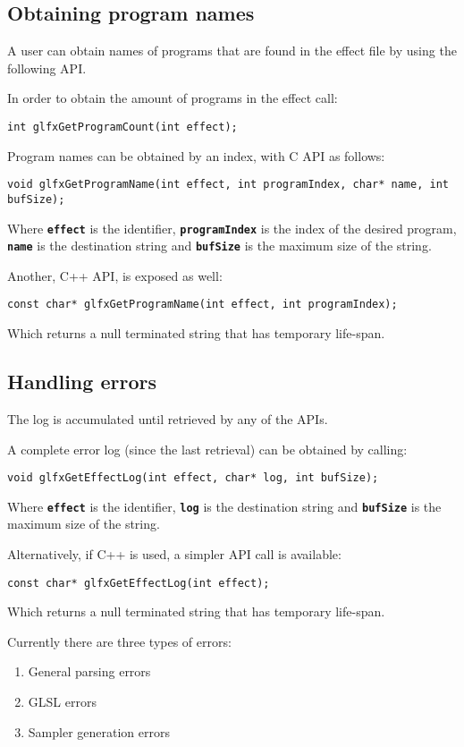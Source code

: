\documentclass[11pt,a4paper,final,titlepage]{article}
\begin{document}
\subsection{Obtaining program names}
A user can obtain names of programs that are found in the effect file by using the following API.

In order to obtain the amount of programs in the effect call:
\begin{lstlisting}
int glfxGetProgramCount(int effect);
\end{lstlisting}

Program names can be obtained by an index, with C API as follows:
\begin{lstlisting}
void glfxGetProgramName(int effect, int programIndex, char* name, int bufSize);
\end{lstlisting}
Where \texttt{\textbf{effect}} is the identifier, \texttt{\textbf{programIndex}} is the index of
the desired program, \texttt{\textbf{name}} is the destination
string and \texttt{\textbf{bufSize}} is the maximum size of the string.

Another, C++ API, is exposed as well:
\begin{lstlisting}
const char* glfxGetProgramName(int effect, int programIndex);
\end{lstlisting}
Which returns a null terminated string that has temporary life-span.

\subsection{Handling errors}
The log is accumulated until retrieved by any of the APIs.

A complete error log (since the last retrieval) can be obtained by calling:
\begin{lstlisting}
void glfxGetEffectLog(int effect, char* log, int bufSize);
\end{lstlisting}
Where \texttt{\textbf{effect}} is the identifier, \texttt{\textbf{log}} is the destination
string and \texttt{\textbf{bufSize}} is the maximum size of the string.

Alternatively, if C++ is used, a simpler API call is available:
\begin{lstlisting}
const char* glfxGetEffectLog(int effect);
\end{lstlisting}
Which returns a null terminated string that has temporary life-span.

Currently there are three types of errors:
\begin{enumerate}
\item General parsing errors
\item GLSL errors
\item Sampler generation errors
\end{enumerate}
\end{document}
